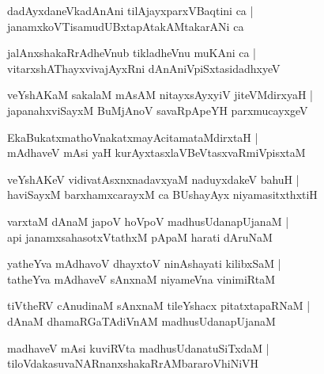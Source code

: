 \documentclass[twoside,12pt,openright]{book}
\newcounter{shloka}[chapter]
\begin{document}
\begin{shloka}%
dadAyxdaneVkadAnAni tilAjayxparxVBaqtini ca |\\
janamxkoVTisamudUBxtapAtakAMtakarANi ca 
\end{shloka}

\begin{shloka}%
jalAnxshakaRrAdheVnub tikladheVnu muKAni ca |\\
vitarxshAThayxvivajAyxRni dAnAniVpiSxtasidadhxyeV 
\end{shloka}

\begin{shloka}%
veYshAKaM sakalaM mAsAM nitayxsAyxyiV jiteVMdirxyaH |\\
japanahxviSayxM BuMjAnoV savaRpApeYH parxmucayxgeV 
\end{shloka}

\begin{shloka}%
EkaBukatxmathoVnakatxmayAcitamataMdirxtaH |\\
mAdhaveV mAsi yaH kurAyxtasxlaVBeVtasxvaRmiVpisxtaM 
\end{shloka}

\begin{shloka}%
veYshAKeV vidivatAsxnxnadavxyaM naduyxdakeV bahuH |\\
haviSayxM barxhamxcarayxM ca BUshayAyx niyamasitxthxtiH 
\end{shloka}

\begin{shloka}%
varxtaM dAnaM japoV hoVpoV madhusUdanapUjanaM |\\
api janamxsahasotxVtathxM pApaM harati dAruNaM 
\end{shloka}

\begin{shloka}%
yatheYva mAdhavoV dhayxtoV ninAshayati kilibxSaM |\\
tatheYva mAdhaveV sAnxnaM niyameVna vinimiRtaM 
\end{shloka}

\begin{shloka}%
tiVtheRV cAnudinaM sAnxnaM tileYshacx pitatxtapaRNaM |\\
dAnaM dhamaRGaTAdiVnAM madhusUdanapUjanaM 
\end{shloka}

\begin{shloka}%
madhaveV mAsi kuviRVta madhusUdanatuSiTxdaM |\\
tiloVdakasuvaNARnanxshakaRrAMbararoVhiNiVH
\end{shloka}
\end{document}
